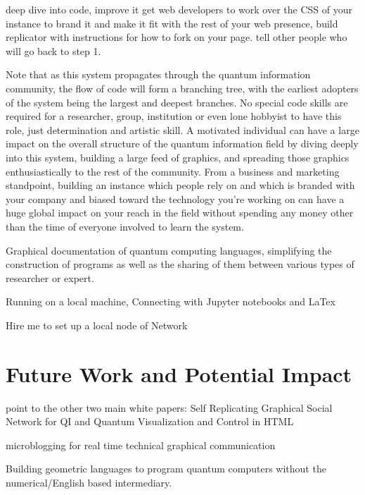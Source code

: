 \documentclass[11pt]{article}
\begin{document}
deep dive into code, improve it
get web developers to work over the CSS of your instance to brand it and make it fit with the rest of your web presence, build replicator with instructions for how to fork on your page. 
tell other people who will go back to step 1.



Note that as this system propagates through the quantum information community, the flow of code will form a branching tree, with the earliest adopters of the system being the largest and deepest branches.  No special code skills are required for a researcher, group, institution or even lone hobbyist to have this role, just determination and artistic skill.  A motivated individual can have a large impact on the overall structure of the quantum information field by diving deeply into this system, building a large feed of graphics, and spreading those graphics enthusiastically to the rest of the community.  From a business and marketing standpoint, building an instance which people rely on  and which is branded with your company and biased toward the technology you're working on can have a huge global impact on your reach in the field without spending any money other than the time of everyone involved to learn the system.  







    Graphical documentation of quantum computing languages, simplifying the construction of programs as well as the sharing of them between various types of researcher or expert.




    Running on a local machine, Connecting with Jupyter notebooks and LaTex



Hire me to set up a local node of Network


\section{Future Work and Potential Impact}


point to the other two main white papers: 
    Self Replicating Graphical Social Network for QI and 
    Quantum Visualization and Control in HTML

    microblogging for real time technical graphical communication




    Building geometric languages to program quantum computers without the numerical/English based intermediary.
\end{document}
